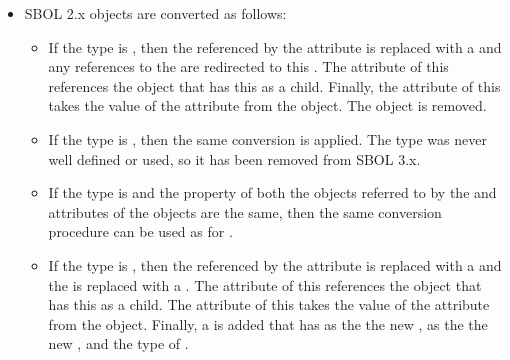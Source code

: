\begin{itemize}
    \item SBOL 2.x  objects are converted as follows:
      \begin{itemize}
      \item If the  type is , then the  referenced by the  attribute is replaced with a  and any references to the  are redirected to this .  The  attribute of this  references the object that has this  as a child.  Finally, the  attribute of this  takes the value of the  attribute from the  object.  The  object is removed.
        \item If the  type is , then the same conversion is applied.  The    type was never well defined or used, so it has been removed from SBOL 3.x.
        \item If the  type is  and the  property of both the objects referred to by the  and  attributes of the  objects are the same, then the same conversion procedure can be used as for .
        \item If the  type is , then the  referenced by the  attribute is replaced with a  and the  is replaced with a .  The  attribute of this  references the object that has this  as a child.  The  attribute of this  takes the value of the  attribute from the  object.  Finally, a  is added that has as the  the new , as the  the new , and the  type of . 
        \end{itemize}
\end{itemize}

